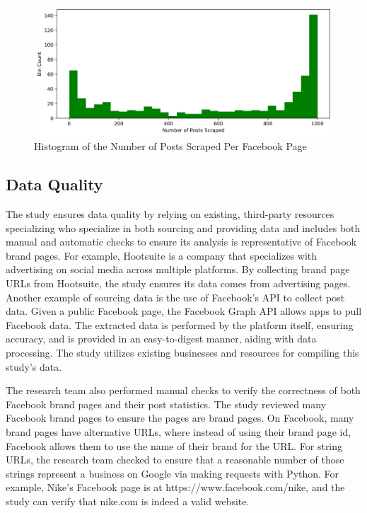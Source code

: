 \documentclass[mksc,blindrev]{informs3} %
\begin{document}
\begin{figure}
    \includegraphics[width=\columnwidth]{images/Posts_Per_Page_Histogram.png}
    \caption{Histogram of the Number of Posts Scraped Per Facebook Page}
    \label{fig:histogram_posts_scraped}
\end{figure}

\subsection{Data Quality}

The study ensures data quality by relying on existing, third-party resources specializing who specialize in both sourcing and providing data and includes both manual and automatic checks to ensure its analysis is representative of Facebook brand pages. For example, Hootsuite is a company that specializes with advertising on social media across multiple platforms. By collecting brand page URLs from Hootsuite, the study ensures its data comes from advertising pages. Another example of sourcing data is the use of Facebook's API to collect post data. Given a public Facebook page, the Facebook Graph API allows apps to pull Facebook data. The extracted data is performed by the platform itself, ensuring accuracy, and is provided in an easy-to-digest manner, aiding with data processing. The study utilizes existing businesses and resources for compiling this study's data.

The research team also performed manual checks to verify the correctness of both Facebook brand pages and their post statistics. The study reviewed many Facebook brand pages to ensure the pages are brand pages. On Facebook, many brand pages have alternative URLs, where instead of using their brand page id, Facebook allows them to use the name of their brand for the URL. For string URLs, the research team checked to ensure that a reasonable number of those strings represent a business on Google via making requests with Python. For example, Nike's Facebook page is at https://www.facebook.com/nike, and the study can verify that nike.com is indeed a valid website.
\end{document}
